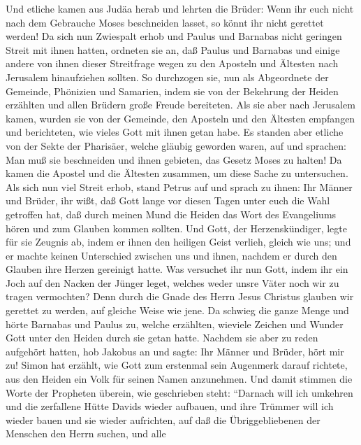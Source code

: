  Und etliche kamen aus Judäa herab und lehrten die Brüder:
Wenn ihr euch nicht nach dem Gebrauche Moses beschneiden lasset, so
könnt ihr nicht gerettet werden!  Da sich nun Zwiespalt
erhob und Paulus und Barnabas nicht geringen Streit mit ihnen hatten,
ordneten sie an, daß Paulus und Barnabas und einige andere von ihnen
dieser Streitfrage wegen zu den Aposteln und Ältesten nach Jerusalem
hinaufziehen sollten.  So durchzogen sie, nun als
Abgeordnete der Gemeinde, Phönizien und Samarien, indem sie von der
Bekehrung der Heiden erzählten und allen Brüdern große Freude
bereiteten.  Als sie aber nach Jerusalem kamen, wurden sie
von der Gemeinde, den Aposteln und den Ältesten empfangen und
berichteten, wie vieles Gott mit ihnen getan habe.  Es
standen aber etliche von der Sekte der Pharisäer, welche gläubig
geworden waren, auf und sprachen: Man muß sie beschneiden und ihnen
gebieten, das Gesetz Moses zu halten!  Da kamen die
Apostel und die Ältesten zusammen, um diese Sache zu untersuchen.
 Als sich nun viel Streit erhob, stand Petrus auf und
sprach zu ihnen: Ihr Männer und Brüder, ihr wißt, daß Gott lange vor
diesen Tagen unter euch die Wahl getroffen hat, daß durch meinen Mund
die Heiden das Wort des Evangeliums hören und zum Glauben kommen
sollten.  Und Gott, der Herzenskündiger, legte für sie
Zeugnis ab, indem er ihnen den heiligen Geist verlieh, gleich wie uns;
 und er machte keinen Unterschied zwischen uns und ihnen,
nachdem er durch den Glauben ihre Herzen gereinigt hatte.
 Was versuchet ihr nun Gott, indem ihr ein Joch auf den
Nacken der Jünger leget, welches weder unsre Väter noch wir zu tragen
vermochten?  Denn durch die Gnade des Herrn Jesus
Christus glauben wir gerettet zu werden, auf gleiche Weise wie jene.
 Da schwieg die ganze Menge und hörte Barnabas und Paulus
zu, welche erzählten, wieviele Zeichen und Wunder Gott unter den Heiden
durch sie getan hatte.  Nachdem sie aber zu reden
aufgehört hatten, hob Jakobus an und sagte: Ihr Männer und Brüder, hört
mir zu!  Simon hat erzählt, wie Gott zum erstenmal sein
Augenmerk darauf richtete, aus den Heiden ein Volk für seinen Namen
anzunehmen.  Und damit stimmen die Worte der Propheten
überein, wie geschrieben steht:  ``Darnach will ich
umkehren und die zerfallene Hütte Davids wieder aufbauen, und ihre
Trümmer will ich wieder bauen und sie wieder aufrichten, 
auf daß die Übriggebliebenen der Menschen den Herrn suchen, und alle
